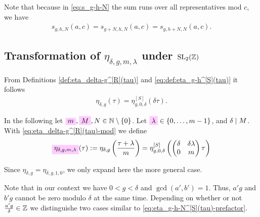 \documentclass{article}
\begin{document}
Note that because in \eqref{eq:s_g-h-N} the sum runs over all
representatives mod $c$, we have
\begin{gather*}
  s_{g,h,N}(a,c)=s_{g+N,h,N}(a,c)=s_{g,h+N,N}(a,c).
\end{gather*}





\subsection{Transformation of $\eta_{\delta,g,m,\lambda}$ under $\SL2Z$}
\label{sec:eta-delta-g-m-lambda-Robins}%

From Definitions \ref{def:eta_delta-g^[R](tau)} and
\ref{eq:def:eta_g-h^[S](tau)} it follows
\begin{align}
  \eta_{\delta,g}(\tau) = \eta_{g,0,\delta}^{[S]}(\delta \tau).
  \label{eq:eta_delta-g^[R](tau)-Schoeneberg}
\end{align}

In the following let
$\defineNotation[m]{m},
\defineNotation[M]{M},
N \in \setN \setminus \Set{0}$.
%
Let $\defineNotation[lambda]{\lambda} \in \Set{0,\ldots,m-1}$, and
$\delta \mid M$.
%
With \eqref{eq:eta_delta-g^[R](tau)-mod} we define
\begin{gather}
  \defineNotation[eta-delta-g-m-lambda-tau]{\eta_{\delta,g,m,\lambda}}(\tau)
  := \eta_{\delta,g}\left(\frac{\tau+\lambda}{m}\right)
  = \eta_{g,0,\delta}^{[S]}
  \left(
    \begin{pmatrix}\delta& \delta \lambda\\0&m\end{pmatrix} \tau
  \right)
\label{eq:eta_delta-g-m-lambda(tau)}
\end{gather}

Since $\eta_{\delta,g}=\eta_{\delta,g,1,0}$, we only expand here the
more general case.

Note that in our context we have $0 < g < \delta$ and
$\gcd(a', b')=1$. Thus, $a'g$ and $b'g$ cannot be zero modulo $\delta$
at the same time.
Depending on whether or not $\frac{a' g}{\delta}\in\mathbb{Z}$ we
distinguishe two cases similar to \eqref{eq:eta_g-h-N^[S](tau)-prefactor}.
\end{document}
